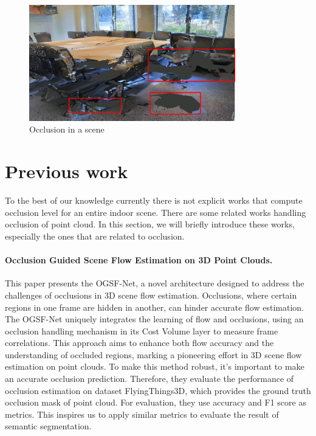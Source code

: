 \documentclass[11pt, a4paper,oneside,chapterprefix=false]{scrbook}
\begin{document}
\begin{figure}[h]
    \centering
    \includegraphics*[width=0.8\textwidth]{figures/occlusion in conf2.png}
    \caption{Occlusion in a scene}
    \label{fig:occlusion in a scene}
\end{figure}

\section{Previous work}
To the best of our knowledge currently there is not explicit works that compute occlusion level for an entire indoor scene. There are some related works handling occlusion of point cloud. In this section, we will briefly introduce these works, especially the ones that are related to occlusion.  


\paragraph{Occlusion Guided Scene Flow Estimation on 3D Point Clouds.}

This paper presents the OGSF-Net, a novel architecture designed to address the challenges of occlusions in 3D scene flow estimation. Occlusions, where certain regions in one frame are hidden in another, can hinder accurate flow estimation. The OGSF-Net uniquely integrates the learning of flow and occlusions, using an occlusion handling mechanism in its Cost Volume layer to measure frame correlations. This approach aims to enhance both flow accuracy and the understanding of occluded regions, marking a pioneering effort in 3D scene flow estimation on point clouds. To make this method robust, it's important to make an accurate occlusion prediction. Therefore, they evaluate the performance of occlusion estimation on dataset FlyingThings3D, which provides the ground truth occlusion mask of point cloud. For evaluation, they use accuracy and F1 score as metrics. This inspires us to apply similar metrics to evaluate the result of semantic segmentation.
\end{document}
